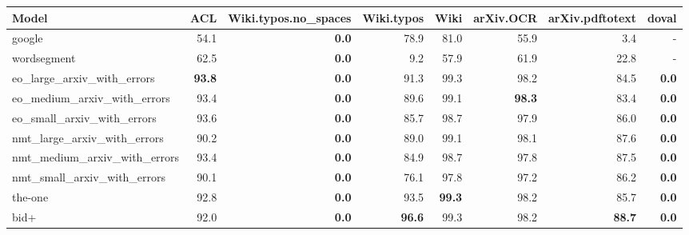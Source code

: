 \begin{tabular}{lrrrrrrr} \hline
Model & ACL & Wiki.typos.no\_spaces & Wiki.typos & Wiki & arXiv.OCR & arXiv.pdftotext & doval \\ \hline
google & 54.1 & \textbf{0.0} & 78.9 & 81.0 & 55.9 & 3.4 & - \\ 
wordsegment & 62.5 & \textbf{0.0} & 9.2 & 57.9 & 61.9 & 22.8 & - \\ \hline
eo\_large\_arxiv\_with\_errors & \textbf{93.8} & \textbf{0.0} & 91.3 & 99.3 & 98.2 & 84.5 & \textbf{0.0} \\ 
eo\_medium\_arxiv\_with\_errors & 93.4 & \textbf{0.0} & 89.6 & 99.1 & \textbf{98.3} & 83.4 & \textbf{0.0} \\ 
eo\_small\_arxiv\_with\_errors & 93.6 & \textbf{0.0} & 85.7 & 98.7 & 97.9 & 86.0 & \textbf{0.0} \\ \hline
nmt\_large\_arxiv\_with\_errors & 90.2 & \textbf{0.0} & 89.0 & 99.1 & 98.1 & 87.6 & \textbf{0.0} \\ 
nmt\_medium\_arxiv\_with\_errors & 93.4 & \textbf{0.0} & 84.9 & 98.7 & 97.8 & 87.5 & \textbf{0.0} \\ 
nmt\_small\_arxiv\_with\_errors & 90.1 & \textbf{0.0} & 76.1 & 97.8 & 97.2 & 86.2 & \textbf{0.0} \\ \hline
the-one & 92.8 & \textbf{0.0} & 93.5 & \textbf{99.3} & 98.2 & 85.7 & \textbf{0.0} \\ 
bid+ & 92.0 & \textbf{0.0} & \textbf{96.6} & 99.3 & 98.2 & \textbf{88.7} & \textbf{0.0} \\ \hline
\end{tabular}
